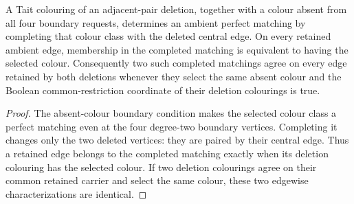 \begin{lemma}
\label{lem:deletion-colour-matching-overlap}
A Tait colouring of an adjacent-pair deletion, together with a colour absent
from all four boundary requests, determines an ambient perfect matching by
completing that colour class with the deleted central edge.  On every
retained ambient edge, membership in the completed matching is equivalent to
having the selected colour.  Consequently two such completed matchings agree
on every edge retained by both deletions whenever they select the same absent
colour and the Boolean common-restriction coordinate of their deletion
colourings is true.
\end{lemma}

\begin{proof}
The absent-colour boundary condition makes the selected colour class a
perfect matching even at the four degree-two boundary vertices.  Completing
it changes only the two deleted vertices: they are paired by their central
edge.  Thus a retained edge belongs to the completed matching exactly when
its deletion colouring has the selected colour.  If two deletion colourings
agree on their common retained carrier and select the same colour, these two
edgewise characterizations are identical.
\end{proof}

